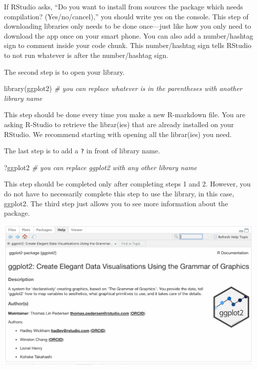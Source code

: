 \documentclass[
]{book}
\newenvironment{Shaded}{\begin{snugshade}}{\end{snugshade}}
\newcommand{\CommentTok}[1]{\textcolor[rgb]{0.56,0.35,0.01}{\textit{#1}}}
\newcommand{\FunctionTok}[1]{\textcolor[rgb]{0.00,0.00,0.00}{#1}}
\newcommand{\NormalTok}[1]{#1}
\begin{document}
If RStudio asks, ``Do you want to install from sources the package which needs compilation? (Yes/no/cancel),'' you should write yes on the console. This step of downloading libraries only needs to be done once---just like how you only need to download the app once on your smart phone. You can also add a number/hashtag sign to comment inside your code chunk. This number/hashtag sign tells RStudio to not run whatever is after the number/hashtag sign.

The second step is to open your library.

\begin{Shaded}
\begin{Highlighting}[]
\FunctionTok{library}\NormalTok{(ggplot2) }\CommentTok{\# you can replace whatever is in the parentheses with another library name }
\end{Highlighting}
\end{Shaded}

This step should be done every time you make a new R-markdown file. You are asking R-Studio to retrieve the librar(ies) that are already installed on your RStudio. We recommend starting with opening all the librar(ies) you need.

The last step is to add a \texttt{?} in front of library name.

\begin{Shaded}
\begin{Highlighting}[]
\NormalTok{?ggplot2 }\CommentTok{\# you can replace ggplot2 with any other library name}
\end{Highlighting}
\end{Shaded}

This step should be completed only after completing steps 1 and 2. However, you do not have to necessarily complete this step to use the library, in this case, ggplot2. The third step just allows you to see more information about the package.

\includegraphics[width=1\linewidth]{images-figures/03-ggplot2}
\end{document}
